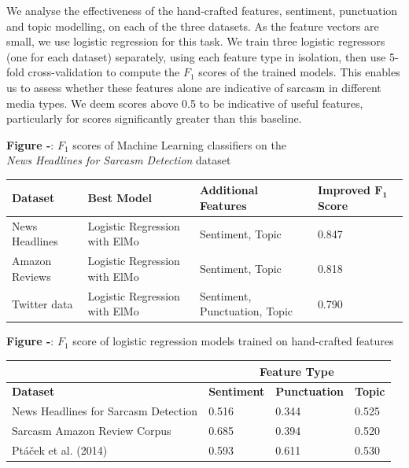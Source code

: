 \documentclass[12pt,a4paper]{article}
\begin{document}
\noindent We analyse the effectiveness of the hand-crafted features, sentiment, punctuation and topic modelling, on each of the three datasets. As the feature vectors are small, we use logistic regression for this task. We train three logistic regressors (one for each dataset) separately, using each feature type in isolation, then use 5-fold cross-validation to compute the $F_1$ scores of the trained models. This enables us to assess whether these features alone are indicative of sarcasm in different media types. We deem scores above 0.5 to be indicative of useful features, particularly for scores significantly greater than this baseline.

\begin{center}
	\textbf{Figure -}: $F_1$ scores of Machine Learning classifiers on the \\\textit{News Headlines for Sarcasm Detection} dataset
\end{center}

\begin{center}
	\begin{tabular}{ |p{3cm}||p{2.8cm}|p{3.7cm}|p{2cm}|  }
		\hline
		\textbf{Dataset} & \textbf{Best Model}& \textbf{Additional Features} & \textbf{Improved $\mathbf{F_1}$ Score}\\
		\hline\hline
		News Headlines & Logistic Regression with ElMo & Sentiment, Topic   & 0.847\\
		\hline
		Amazon Reviews& Logistic Regression  with ElMo& Sentiment, Topic & 0.818\\
		\hline
		Twitter data & Logistic Regression  with ElMo& Sentiment, Punctuation, Topic  & 0.790\\
		\hline
	\end{tabular}
\end{center}

\newpage
\begin{center}
	\textbf{Figure -}: $F_1$ score of logistic regression models trained on hand-crafted features
\end{center}

\begin{center}
	\begin{tabular}{|p{7cm}|p{1.8cm}|p{2.6cm}|p{1.6cm}|} 
		\hline
		& \multicolumn{3}{|c|}{\textbf{Feature Type}} \\
		\hline
		\textbf{Dataset} & \textbf{Sentiment} & \textbf{Punctuation} & \textbf{Topic} \\ [0.4ex] 
		\hline\hline
		News Headlines for Sarcasm Detection & 0.516 & 0.344 & 0.525\\ 
		\hline
		Sarcasm Amazon Review Corpus & 0.685 & 0.394 & 0.520\\ 
		\hline
		Pt\'a\v{c}ek et al. (2014) & 0.593 & 0.611 & 0.530\\
		\hline
	\end{tabular}
\end{center}
\end{document}
